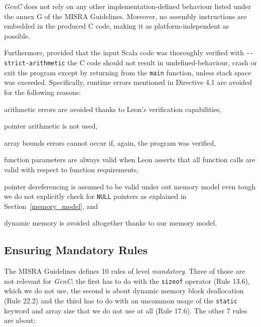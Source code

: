 \documentclass[a4paper,twoside]{article}
\newcommand{\Inline}[1]{\lstinline[basicstyle=\ttfamily]|#1|}
\newcommand{\InlineC}[1]{\lstinline[language=C99]|#1|}
\newcommand{\GenC}{\emph{GenC}\xspace}
\newcommand{\RefSec}[1]{Section~\ref{#1}}
\begin{document}
\GenC does not rely on any other implementation-defined behaviour listed under
the annex G of the MISRA Guidelines. Moreover, no assembly instructions are
embedded in the produced C code, making it as platform-independent as possible.

Furthermore, provided that the input Scala code was thoroughly verified with
\Inline{--strict-arithmetic} the C code should not result in
undefined-behaviour, crash or exit the program except by returning from the
\InlineC{main} function, unless stack space was exceeded. Specifically, runtime
errors mentioned in Directive 4.1 are avoided for the following reasons:
\begin{enumerate*}[label=\arabic*\upshape)]

\item arithmetic errors are avoided thanks to Leon's verification capabilities,

\item pointer arithmetic is not used,

\item array bounds errors cannot occur if, again, the program was verified,

\item function parameters are always valid when Leon asserts that all function
calls are valid with respect to function requirements,

\item pointer dereferencing is assumed to be valid under out memory model even
tough we do not explicitly check for \InlineC{NULL} pointers as explained in
\RefSec{memory_model}, and

\item dynamic memory is avoided altogether thanks to our memory model.

\end{enumerate*}

\subsection{Ensuring Mandatory Rules}
\label{mandatory_rules}

The MISRA Guidelines defines 10 rules of level \emph{mandatory}. Three of those
are not relevant for \GenC: the first has to do with the \InlineC{sizeof}
operator (Rule 13.6), which we do not use, the second is about dynamic memory
block deallocation (Rule 22.2) and the third has to do with an uncommon usage of
the \InlineC{static} keyword and array size that we do not use at all (Rule
17.6). The other 7 rules are about:
\end{document}
